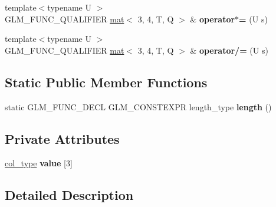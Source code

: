 \begin{DoxyCompactItemize}
\item 
\mbox{\label{structglm_1_1mat_3_013_00_014_00_01T_00_01Q_01_4_aab8941404df3b9d3243c121f9ba91cc1}} 
{\footnotesize template$<$typename U $>$ }\\G\+L\+M\+\_\+\+F\+U\+N\+C\+\_\+\+Q\+U\+A\+L\+I\+F\+I\+ER \hyperlink{structglm_1_1mat}{mat}$<$ 3, 4, T, Q $>$ \& {\bfseries operator$\ast$=} (U s)
\item 
\mbox{\label{structglm_1_1mat_3_013_00_014_00_01T_00_01Q_01_4_ae47ccda80c8464f365fc31bbafb57a17}} 
{\footnotesize template$<$typename U $>$ }\\G\+L\+M\+\_\+\+F\+U\+N\+C\+\_\+\+Q\+U\+A\+L\+I\+F\+I\+ER \hyperlink{structglm_1_1mat}{mat}$<$ 3, 4, T, Q $>$ \& {\bfseries operator/=} (U s)
\end{DoxyCompactItemize}
\subsection*{Static Public Member Functions}
\begin{DoxyCompactItemize}
\item 
\mbox{\label{structglm_1_1mat_3_013_00_014_00_01T_00_01Q_01_4_aee79c3b80a64a53f025f031a01280a35}} 
static G\+L\+M\+\_\+\+F\+U\+N\+C\+\_\+\+D\+E\+CL G\+L\+M\+\_\+\+C\+O\+N\+S\+T\+E\+X\+PR length\+\_\+type {\bfseries length} ()
\end{DoxyCompactItemize}
\subsection*{Private Attributes}
\begin{DoxyCompactItemize}
\item 
\mbox{\label{structglm_1_1mat_3_013_00_014_00_01T_00_01Q_01_4_a5565dc4ee500797675a5841e79cf8d3c}} 
\hyperlink{structglm_1_1vec_3_014_00_01T_00_01Q_01_4}{col\+\_\+type} {\bfseries value} \mbox{[}3\mbox{]}
\end{DoxyCompactItemize}


\subsection{Detailed Description}
